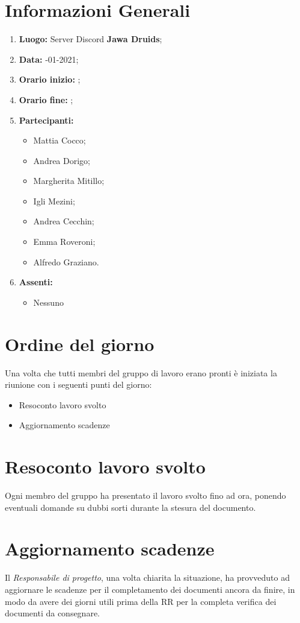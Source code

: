 	\newpage
	\section{Informazioni Generali}
	\begin{enumerate}
		\item \textbf{Luogo:} \normalfont Server Discord \textbf{Jawa Druids};
		\item \textbf{Data:} -01-2021;
		\item \textbf{Orario inizio:} ;
		\item \textbf{Orario fine:} ;
		\item \textbf{Partecipanti:}
		\begin{itemize}
			\item Mattia Cocco;
			\item Andrea Dorigo;
			\item Margherita Mitillo;
			\item Igli Mezini;
			\item Andrea Cecchin;
			\item Emma Roveroni;
			\item Alfredo Graziano.
		\end{itemize}
		\item \textbf{Assenti:}
		\begin{itemize}
			\item Nessuno
		\end{itemize}
	\end{enumerate}
	\section{Ordine del giorno}
	Una volta che tutti membri del gruppo di lavoro erano pronti è iniziata la riunione con i seguenti punti del giorno:
	\begin{itemize}
		\item Resoconto lavoro svolto
		\item Aggiornamento scadenze
	\end{itemize}

	\section{Resoconto lavoro svolto}
	Ogni membro del gruppo ha presentato il lavoro svolto fino ad ora, ponendo eventuali domande su dubbi sorti durante la stesura del documento.

	\section{Aggiornamento scadenze}
	Il \textit{Responsabile di progetto}, una volta chiarita la situazione, ha provveduto ad aggiornare le scadenze per il completamento dei documenti ancora da finire, in modo da avere dei giorni utili prima della RR per la completa verifica dei documenti da consegnare.

